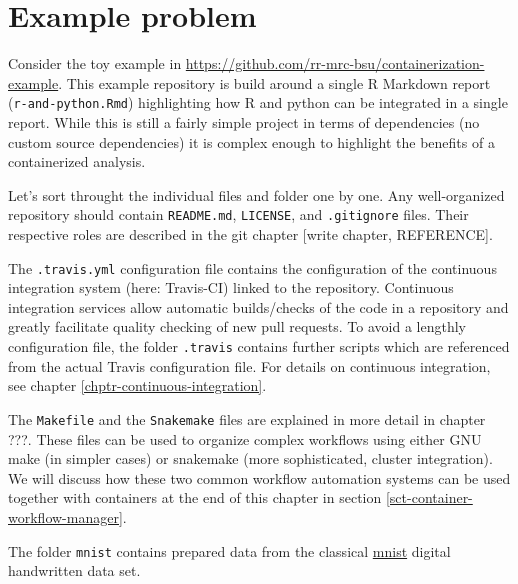 \documentclass[]{book}
\begin{document}
\section{Example problem}\label{example-problem}

Consider the toy example in
\url{https://github.com/rr-mrc-bsu/containerization-example}. This
example repository is build around a single R Markdown report
(\texttt{r-and-python.Rmd}) highlighting how R and python can be
integrated in a single report. While this is still a fairly simple
project in terms of dependencies (no custom source dependencies) it is
complex enough to highlight the benefits of a containerized analysis.

Let's sort throught the individual files and folder one by one. Any
well-organized repository should contain \texttt{README.md},
\texttt{LICENSE}, and \texttt{.gitignore} files. Their respective roles
are described in the git chapter {[}write chapter, REFERENCE{]}.

The \texttt{.travis.yml} configuration file contains the configuration
of the continuous integration system (here: Travis-CI) linked to the
repository. Continuous integration services allow automatic
builds/checks of the code in a repository and greatly facilitate quality
checking of new pull requests. To avoid a lengthly configuration file,
the folder \texttt{.travis} contains further scripts which are
referenced from the actual Travis configuration file. For details on
continuous integration, see chapter \ref{chptr-continuous-integration}.

The \texttt{Makefile} and the \texttt{Snakemake} files are explained in
more detail in chapter ???. These files can be used to organize complex
workflows using either GNU make (in simpler cases) or snakemake (more
sophisticated, cluster integration). We will discuss how these two
common workflow automation systems can be used together with containers
at the end of this chapter in section
\ref{sct-container-workflow-manager}.

The folder \texttt{mnist} contains prepared data from the classical
\href{http://yann.lecun.com/exdb/mnist/}{mnist} digital handwritten data
set.
\end{document}
